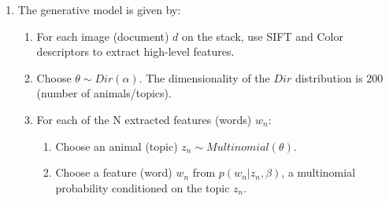 \documentclass{article}
\begin{document}
\begin{enumerate}
\begin{enumerate}
\begin{itemize}
\end{itemize}
\item
The generative model is given by:
\begin{enumerate}
\item For each image (document) $d$ on the stack, use SIFT and Color descriptors to extract high-level features.
\item Choose $\theta \sim Dir(\alpha)$. The dimensionality of the $Dir$ distribution is 200 (number of animals/topics).
\item For each of the N extracted features (words) $w_n$:
\begin{enumerate}
\item Choose an animal (topic) $z_n \sim Multinomial(\theta)$.
\item Choose a feature (word) $w_n$ from $p(w_n|z_n,\beta)$, a multinomial probability conditioned on the topic $z_n$.
\end{enumerate}
\end{enumerate}


\end{enumerate}
\end{enumerate}
\end{document}
